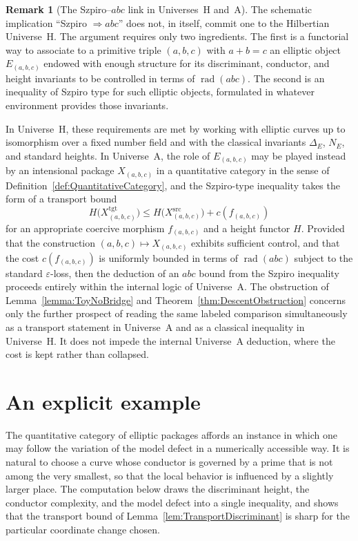 \documentclass[10pt, reqno]{amsart}
\theoremstyle{plain}
\theoremstyle{definition}
\newtheorem{remark}[theorem]{Remark}
\theoremstyle{plain}
\begin{document}
\begin{remark}[The Szpiro--\texorpdfstring{$abc$}{abc} link in Universes~H and~A]\label{rem:SzpiroAbcUniverses}
The schematic implication ``Szpiro $\Rightarrow abc$'' does not, in itself, commit one to the Hilbertian Universe~H. The argument requires only two ingredients. The first is a functorial way to associate to a primitive triple $(a,b,c)$ with $a+b=c$ an elliptic object $E_{(a,b,c)}$ endowed with enough structure for its discriminant, conductor, and height invariants to be controlled in terms of $\operatorname{rad}(abc)$. The second is an inequality of Szpiro type for such elliptic objects, formulated in whatever environment provides those invariants.

In Universe~H, these requirements are met by working with elliptic curves up to isomorphism over a fixed number field and with the classical invariants $\Delta_E$, $N_E$, and standard heights. In Universe~A, the role of $E_{(a,b,c)}$ may be played instead by an intensional package $X_{(a,b,c)}$ in a quantitative category in the sense of Definition~\ref{def:QuantitativeCategory}, and the Szpiro-type inequality takes the form of a transport bound
\[
  H\bigl(X_{(a,b,c)}^{\mathrm{tgt}}\bigr) \le H\bigl(X_{(a,b,c)}^{\mathrm{src}}\bigr) + c\!\left(f_{(a,b,c)}\right)
\]
for an appropriate coercive morphism $f_{(a,b,c)}$ and a height functor $H$. Provided that the construction $(a,b,c) \mapsto X_{(a,b,c)}$ exhibits sufficient control, and that the cost $c(f_{(a,b,c)})$ is uniformly bounded in terms of $\operatorname{rad}(abc)$ subject to the standard $\varepsilon$-loss, then the deduction of an $abc$ bound from the Szpiro inequality proceeds entirely within the internal logic of Universe~A. The obstruction of Lemma~\ref{lemma:ToyNoBridge} and Theorem~\ref{thm:DescentObstruction} concerns only the further prospect of reading the same labeled comparison simultaneously as a transport statement in Universe~A and as a classical inequality in Universe~H. It does not impede the internal Universe~A deduction, where the cost is kept rather than collapsed.
\end{remark}

\section{An explicit example}\label{sec:ExplicitExample}

The quantitative category of elliptic packages affords an instance in which one may follow the variation of the model defect in a numerically accessible way. It is natural to choose a curve whose conductor is governed by a prime that is not among the very smallest, so that the local behavior is influenced by a slightly larger place. The computation below draws the discriminant height, the conductor complexity, and the model defect into a single inequality, and shows that the transport bound of Lemma~\ref{lem:TransportDiscriminant} is sharp for the particular coordinate change chosen.
\end{document}
